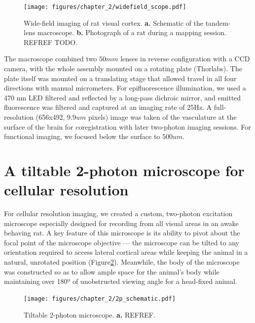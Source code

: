 \begin{figure}
    \texttt{[image: figures/chapter\_2/widefield\_scope.pdf]}
    \vspace{.1in}
    \caption[Tandem-lens macroscope]{Wide-field imaging of rat visual cortex. \textbf{a.} Schematic of the tandem-lens macroscope. \textbf{b.} Photograph of a rat during a mapping session. REFREF TODO.
    \label{fig:widefield_scope}}
\end{figure}

The macroscope combined two $50mm$ lenses in reverse configuration with a CCD camera, with the whole assembly mounted on a rotating plate (Thorlabs). The plate itself was mounted on a translating stage that allowed travel in all four directions with manual micrometers. For epifluorescence illumination, we used a 470 nm LED filtered and reflected by a long-pass dichroic mirror, and emitted fluorescence was filtered and captured at an imaging rate of 25Hz. A full-resolution (656x492, $9.9um$ pixels) image was taken of the vasculature at the surface of the brain for coregistration with later two-photon imaging sessions. For functional imaging, we focused below the surface to $500um$. 

\section{A tiltable 2-photon microscope for cellular resolution}
For cellular resolution imaging, we created a custom, two-photon excitation microscope especially designed for recording from all visual areas in an awake behaving rat. A key feature of this microscope is its ability to pivot about the focal point of the microscope objective --- the microscope can be tilted to any orientation required to access lateral cortical areas while keeping the animal in a natural, unrotated position (Figure\ref{fig:2p_schematic}). Meanwhile, the body of the microscope was constructed so as to allow ample space for the animal's body while maintaining over 180º of unobstructed viewing angle for a head-fixed animal.

\begin{figure}[t!]
    \texttt{[image: figures/chapter\_2/2p\_schematic.pdf]}
    \vspace{.1in}
    \caption[Tilting two-photon microscope]{Tiltable 2-photon microscope. \textbf{a.} REFREF.
    \label{fig:2p_schematic}}
\end{figure}

